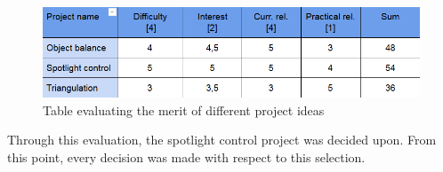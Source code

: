 \begin{figure}[h!]
\centering
\includegraphics[scale=0.7]{Billeder/ProjectEvaluation.png}
\caption{Table evaluating the merit of different project ideas}
\label{fig:ProjectEvaluation}
\end{figure}

Through this evaluation, the spotlight control project was decided upon. From this point, every decision was made with respect to this selection.